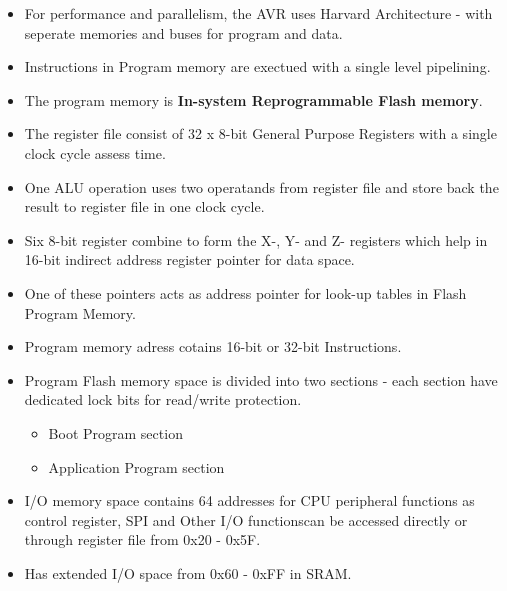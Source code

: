 \documentclass{article}
\begin{document}
\begin{itemize}
    \item For performance and parallelism, the AVR uses Harvard Architecture - with seperate memories and buses for program and data.
    \item Instructions in Program memory are exectued with a single level pipelining.
    \item The program memory is  \textbf{In-system Reprogrammable Flash memory}.
    \item The register file consist of 32 x 8-bit General Purpose Registers with a single clock cycle assess time.
    \item One ALU operation uses two operatands from register file and store back the result to register file in one clock cycle.
    \item Six 8-bit register combine to form the X-, Y- and Z- registers which help in 16-bit indirect address register pointer for data space.
    \item One of these pointers acts as address pointer for look-up tables in Flash Program Memory.
    \item Program memory adress cotains 16-bit or 32-bit Instructions.
    \item Program Flash memory space is divided into two sections - each section have dedicated lock bits for read/write protection.
          \begin{itemize}
              \item Boot Program section
              \item Application Program section
          \end{itemize}
    \item I/O memory space contains 64 addresses for CPU peripheral functions as control register, SPI and Other I/O functionscan be accessed directly or through register file from 0x20 - 0x5F.
    \item Has extended I/O space from 0x60 - 0xFF in SRAM.
\end{itemize}
\end{document}
